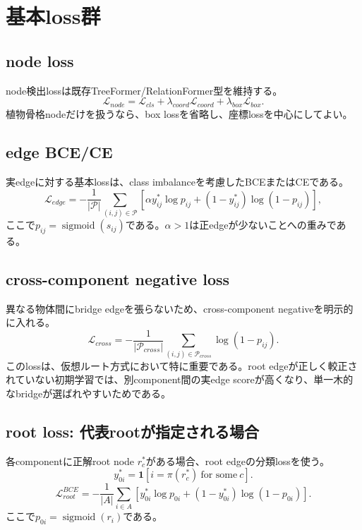 \documentclass[11pt,a4paper]{article}
\newcommand{\one}{\mathbf{1}}
\newcommand{\sigmoid}{\operatorname{sigmoid}}
\begin{document}
\section{基本loss群}
\subsection{node loss}
node検出lossは既存TreeFormer/RelationFormer型を維持する。
\begin{equation}
  \mathcal{L}_{node}=\mathcal{L}_{cls}+\lambda_{coord}\mathcal{L}_{coord}+\lambda_{box}\mathcal{L}_{box}.
\end{equation}
植物骨格nodeだけを扱うなら、box lossを省略し、座標lossを中心にしてよい。

\subsection{edge BCE/CE}
実edgeに対する基本lossは、class imbalanceを考慮したBCEまたはCEである。
\begin{equation}
  \mathcal{L}_{edge}
  =
  -\frac{1}{|\mathcal{P}|}
  \sum_{(i,j)\in\mathcal{P}}
  \left[
    \alpha y_{ij}^*\log p_{ij}
    +(1-y_{ij}^*)\log(1-p_{ij})
  \right],
\end{equation}
ここで$p_{ij}=\sigmoid(s_{ij})$である。$\alpha>1$は正edgeが少ないことへの重みである。

\subsection{cross-component negative loss}
異なる物体間にbridge edgeを張らないため、cross-component negativeを明示的に入れる。
\begin{equation}
  \mathcal{L}_{cross}
  =
  -\frac{1}{|\mathcal{P}_{cross}|}
  \sum_{(i,j)\in\mathcal{P}_{cross}}
  \log(1-p_{ij}).
  \label{eq:cross_loss}
\end{equation}
このlossは、仮想ルート方式において特に重要である。root edgeが正しく較正されていない初期学習では、別component間の実edge scoreが高くなり、単一木的なbridgeが選ばれやすいためである。

\subsection{root loss: 代表rootが指定される場合}
各componentに正解root node $r_c^*$がある場合、root edgeの分類lossを使う。
\begin{equation}
  y_{0i}^*=\one[i=\pi(r_c^*)\ \text{for some}\ c].
\end{equation}
\begin{equation}
  \mathcal{L}_{root}^{BCE}
  =
  -\frac{1}{|A|}
  \sum_{i\in A}
  \left[
    y_{0i}^*\log p_{0i}+(1-y_{0i}^*)\log(1-p_{0i})
  \right].
\end{equation}
ここで$p_{0i}=\sigmoid(r_i)$である。
\end{document}
